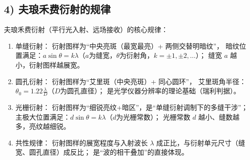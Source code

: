 \documentclass[11pt]{article}
\begin{document}
\subsection*{4) 夫琅禾费衍射的规律}
夫琅禾费衍射（平行光入射、远场接收）的核心规律：
\begin{enumerate}
    \item 单缝衍射：
          衍射图样为“中央亮斑（最宽最亮）+ 两侧交替明暗纹”，
          暗纹位置满足：$a\sin\theta = k\lambda$（$a$为缝宽，$\theta$为衍射角，$k=\pm1,\pm2,\dots$）；
          缝宽 $a$ 越小，衍射图样越展宽。

    \item 圆孔衍射：
          衍射图样为“艾里斑（中央亮斑）+ 同心圆环”，
          艾里斑角半径：$\theta_0 = 1.22\frac{\lambda}{D}$（$D$为圆孔直径）；
          是光学仪器分辨率的理论基础（瑞利判据）。

    \item 光栅衍射：
          衍射图样为“细锐亮纹+暗区”，是“单缝衍射调制下的多缝干涉”；
          主极大位置满足：$d\sin\theta = k\lambda$（$d$为光栅常数）；
          光栅常数 $d$ 越小、缝数越多，亮纹越细锐。

    \item 共性规律：
          衍射图样的展宽程度与入射波长 $\lambda$ 成正比，与衍射单元尺寸（缝宽、圆孔直径）成反比；
          是“波的相干叠加”的直接体现。
\end{enumerate}
\end{document}

